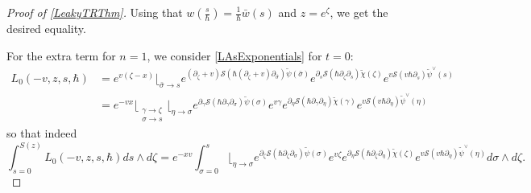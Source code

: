 \documentclass[10pt,a4paper,oneside,no-math,reqno]{amsart}%
\theoremstyle{plain}
\theoremstyle{definition}
\theoremstyle{remark}
\numberwithin{equation}{section}
\newcommand{\mc}[1]{\mathcal{#1}}
\newcommand{\1}{\mathds{1}}
\newcommand{\<}{\langle}
\renewcommand{\>}{\rangle}
\newcommand{\del}{\partial}
\begin{document}
\begin{proof}[Proof of \cref{LeakyTRThm}]
	Using that $ w(\frac{s}{\hbar}) = \frac{1}{\hbar}\bar{w}(s)$ and $ z = e^\zeta $, we get the desired equality.\par
	For the extra term for $ n =1$, we consider \cref{LAsExponentials} for $ t = 0$:
	\begin{equation}
		\begin{split}
			L_0(-v, z, s, \hbar)
			&=
			e^{v(\zeta - x)} \Big\lfloor_{\bar{\sigma} \to s}
			e^{ (\del_\zeta +v) \mc{S}( \hbar (\del_\zeta + v) \del_{\bar{\sigma}} )\tilde{\psi} (\bar{\sigma}) }
			e^{ \del_s \mc{S}( \hbar \del_\zeta \del_s ) \tilde{\chi} (\zeta) }
			e^{v \mc{S}(v \hbar \del_s) \tilde{\psi}^\vee (s)} 
			\\
			&=
			e^{-v x}
			\Big\lfloor_{\substack{\gamma \to \zeta \\ \sigma \to s}} \Big\lfloor_{\eta \to \sigma}
			e^{ \del_\gamma \mc{S}( \hbar \del_\gamma \del_\sigma )\tilde{\psi} (\sigma ) }
			e^{v \gamma} e^{ \del_\eta \mc{S}( \hbar \del_\gamma \del_\eta)\tilde{\chi} (\gamma) }
			e^{v \mc{S}(v \hbar \del_\eta) \tilde{\psi}^\vee (\eta)}
		\end{split}
	\end{equation}
	so that indeed
	\begin{equation}
		\int_{s = 0}^{S(z)} \!\! L_0 (-v, z, s, \hbar ) ds \wedge d\zeta
		=
		e^{-xv} \int_{\sigma=0}^{s} \Big\lfloor_{\eta \to \sigma} \!\!
			e^{ \del_\zeta \mc{S}( \hbar \del_\zeta \del_\sigma )\tilde{\psi} (\sigma ) }
			e^{v \zeta} e^{ \del_\eta \mc{S}( \hbar \del_\zeta \del_\eta)\tilde{\chi} (\zeta) }
			e^{v \mc{S}(v \hbar \del_\eta) \tilde{\psi}^\vee (\eta)} d\sigma \wedge d\zeta .
	\end{equation}
\end{proof}

\printbibliography
\end{document}
